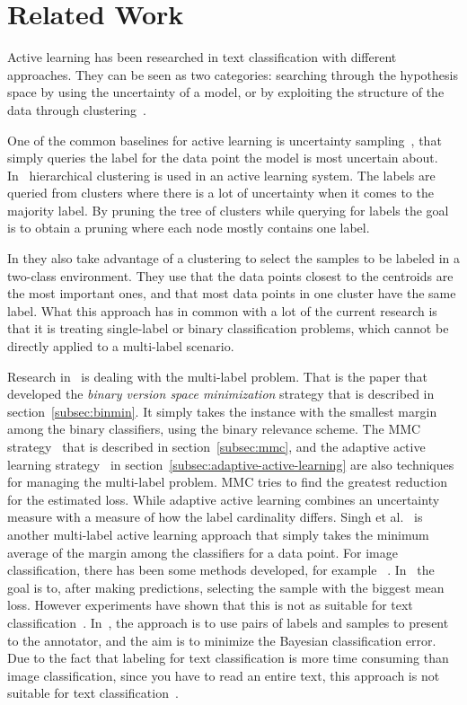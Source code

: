 \section{Related Work}

Active learning has been researched in text classification with different approaches.
They can be seen as two categories: searching through the hypothesis space by using the uncertainty of a model, or by exploiting the structure of the data through clustering~\cite{dasgupta2008hierarchical}.

One of the common baselines for active learning is uncertainty sampling~\cite{lewis1994sequential}, that simply queries the label for the data point the model is most uncertain about.
In~\cite{dasgupta2008hierarchical} hierarchical clustering is used in an active learning system.
The labels are queried from clusters where there is a lot of uncertainty when it comes to the majority label.
By pruning the tree of clusters while querying for labels the goal is to obtain a pruning where each node mostly contains one label.

In \cite{nguyen2004active} they also take advantage of a clustering to select the samples to be labeled in a two-class environment.
They use that the data points closest to the centroids are the most important ones, and that most data points in one cluster have the same label.
What this approach has in common with a lot of the current research is that it is treating single-label or binary classification problems, which cannot be directly applied to a multi-label scenario.

Research in~\cite{brinker2006active} is dealing with the multi-label problem.
That is the paper that developed the \textit{binary version space minimization} strategy that is described in section~\ref{subsec:binmin}.
It simply takes the instance with the smallest margin among the binary classifiers, using the binary relevance scheme.
The MMC strategy~\cite{yang2009effective} that is described in section~\ref{subsec:mmc}, and the adaptive active learning strategy~\cite{li2013active} in section~\ref{subsec:adaptive-active-learning} are also techniques for managing the multi-label problem.
MMC tries to find the greatest reduction for the estimated loss.
While adaptive active learning combines an uncertainty measure with a measure of how the label cardinality differs.
Singh et al\@.~\cite{singh2009active} is another multi-label active learning approach that simply takes the minimum average of the margin among the classifiers for a data point.
For image classification, there has been some methods developed, for example ~\cite{li2004multilabel, qi2008two}.
In~\cite{li2004multilabel} the goal is to, after making predictions, selecting the sample with the biggest mean loss.
However experiments have shown that this is not as suitable for text classification~\cite{yang2009effective}.
In~\cite{qi2008two}, the approach is to use pairs of labels and samples to present to the annotator, and the aim is to minimize the Bayesian classification error.
Due to the fact that labeling for text classification is more time consuming than image classification, since you have to read an entire text, this approach is not suitable for text classification~\cite{yang2009effective}.

